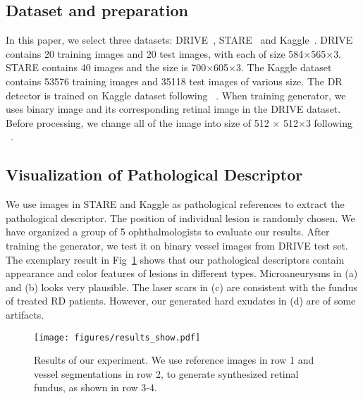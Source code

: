 \documentclass[letterpaper]{article} %
\begin{document}
	\subsection{Dataset and preparation}
	In this paper, we select three datasets: DRIVE~\cite{staal:2004-855}, STARE~\cite{hoover2000locating} and Kaggle~\cite{kaggle2016diabetic}. 
	DRIVE contains 20 training images and 20 test images, with each of size 584$\times$565$\times$3. STARE contains 40  images and the size is 700$\times$605$\times$3. The Kaggle dataset contains 53576 training images and 35118 test images of various size. The DR detector is trained on Kaggle dataset following ~\cite{oO2016detector}. When training generator, we uses binary image and its corresponding retinal image in the DRIVE dataset. Before processing, we change all of the image into size of 512 $\times$ 512$\times$3 following ~\cite{zhao2018synthesizing}.%
	
    
    \subsection{Visualization of Pathological Descriptor}
    
    We use images in STARE and Kaggle as pathological references to extract the pathological descriptor. The position of individual lesion is randomly chosen.  We have organized a group of 5 ophthalmologists to evaluate our results. 
    After training the generator, we test it on binary vessel images from DRIVE test set. The exemplary result in Fig~\ref{fig:results_show} shows that our pathological descriptors contain appearance and color features of lesions in different types. Microaneurysms in (a) and (b) looks very plausible.  The laser scars in (c) are consistent with the fundus of treated RD patients. However, our generated hard exudates in (d) are of some artifacts.
     
	\begin{figure}[t]
		\begin{center}
			\texttt{[image: figures/results\_show.pdf]}
		\end{center}
		\caption{Results of our experiment. We use reference images in row 1 and vessel segmentations in row 2, to generate synthesized retinal fundus, as shown in row 3-4.}
		\label{fig:results_show}
	\end{figure}
    
\end{document}
